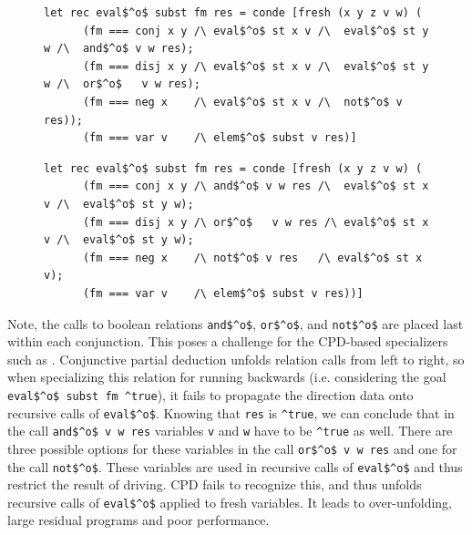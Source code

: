 \begin{figure}[!t]
  \centering
  \begin{minipage}{0.95\textwidth}
    \begin{lstlisting}[label={eval:last}, caption={Evaluator of formulas with boolean operation last}, captionpos=b, frame=tb]
  let rec eval$^o$ subst fm res = conde [fresh (x y z v w) (
      (fm === conj x y /\ eval$^o$ st x v /\  eval$^o$ st y w /\  and$^o$ v w res);
      (fm === disj x y /\ eval$^o$ st x v /\  eval$^o$ st y w /\  or$^o$   v w res);
      (fm === neg x    /\ eval$^o$ st x v /\  not$^o$ v res));
      (fm === var v    /\ elem$^o$ subst v res)]
    \end{lstlisting}
  \end{minipage}
  \begin{minipage}{0.95\textwidth}
    \begin{lstlisting}[label={eval:fst}, caption={Evaluator of formulas with boolean operation second}, captionpos=b, frame=tb]
  let rec eval$^o$ subst fm res = conde [fresh (x y z v w) (
      (fm === conj x y /\ and$^o$ v w res /\  eval$^o$ st x v /\  eval$^o$ st y w);
      (fm === disj x y /\ or$^o$   v w res /\ eval$^o$ st x v /\  eval$^o$ st y w);
      (fm === neg x    /\ not$^o$ v res   /\ eval$^o$ st x v);
      (fm === var v    /\ elem$^o$ subst v res))]
    \end{lstlisting}
  \end{minipage}
\end{figure}

Note, the calls to boolean relations \lstinline{and$^o$}, \lstinline{or$^o$}, and \lstinline{not$^o$} are placed last within each conjunction.
This poses a challenge for the CPD-based specializers such as \ecce.
Conjunctive partial deduction unfolds relation calls from left to right, so when specializing this relation for running backwards (i.e. considering the goal \lstinline{eval$^o$ subst fm ^true}), it fails to propagate the direction data onto recursive calls of \lstinline{eval$^o$}.
Knowing that \lstinline{res} is \lstinline{^true}, we can conclude that in the call \lstinline{and$^o$ v w res} variables \lstinline{v} and \lstinline{w} have to be \lstinline{^true} as well.
There are three possible options for these variables in the call \lstinline{or$^o$ v w res} and one for the call \lstinline{not$^o$}.
These variables are used in recursive calls of \lstinline{eval$^o$} and thus restrict the result of driving.
CPD fails to recognize this, and thus unfolds recursive calls of \lstinline{eval$^o$} applied to fresh variables.
It leads to over-unfolding, large residual programs and poor performance.

